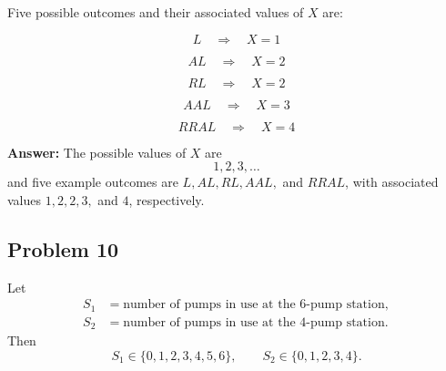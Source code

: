 \documentclass[11pt]{article}
\begin{document}
Five possible outcomes and their associated values of \(X\) are:

\[
L \quad \Rightarrow \quad X=1
\]

\[
AL \quad \Rightarrow \quad X=2
\]

\[
RL \quad \Rightarrow \quad X=2
\]

\[
AAL \quad \Rightarrow \quad X=3
\]

\[
RRAL \quad \Rightarrow \quad X=4
\]

\textbf{Answer:} The possible values of \(X\) are
\[
\boxed{1,2,3,\dots}
\]
and five example outcomes are \(L, AL, RL, AAL,\) and \(RRAL\), with associated values \(1,2,2,3,\) and \(4\), respectively.

\subsection*{Problem 10}

Let
\[
\begin{aligned}
S_1 &= \text{number of pumps in use at the 6-pump station},\\
S_2 &= \text{number of pumps in use at the 4-pump station}.
\end{aligned}
\]
Then
\[
S_1 \in \{0,1,2,3,4,5,6\}, \qquad S_2 \in \{0,1,2,3,4\}.
\]
\end{document}
